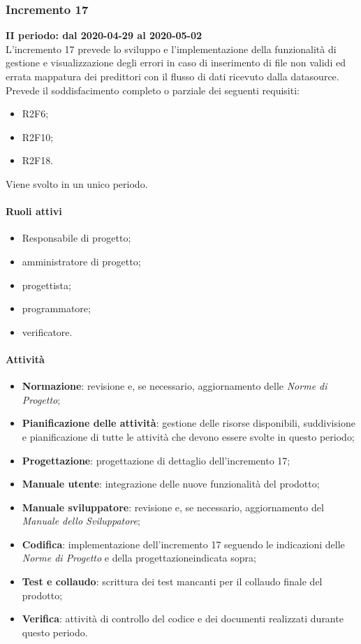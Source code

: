 \subsubsection{Incremento 17}
\textbf{II periodo: dal 2020-04-29 al 2020-05-02} \\
L'incremento 17 prevede lo sviluppo e l'implementazione della funzionalità di gestione e visualizzazione degli errori in caso di inserimento di file non validi ed errata mappatura dei predittori con il flusso di dati ricevuto dalla datasource.
\\Prevede il soddisfacimento completo o parziale dei seguenti requisiti:
\begin{itemize}
	\item R2F6;
	\item R2F10;
	\item R2F18.
\end{itemize}
Viene svolto in un unico periodo.
\paragraph{Ruoli attivi}
\begin{itemize}
	\item Responsabile di progetto\glo;
	\item amministratore di progetto\glo;
	\item progettista;
	\item programmatore;
	\item verificatore.
\end{itemize}
\paragraph{Attività}
\begin{itemize}
	\item \textbf{Normazione}: revisione e, se necessario, aggiornamento delle \textit{Norme di Progetto};
	\item \textbf{Pianificazione delle attività}: gestione delle risorse disponibili, suddivisione e pianificazione di tutte le attività che devono essere svolte in questo periodo;
	\item \textbf{Progettazione}: progettazione di dettaglio dell'incremento 17;
	\item \textbf{Manuale utente}: integrazione delle nuove funzionalità del prodotto\glo;
	\item \textbf{Manuale sviluppatore}:  revisione e, se necessario, aggiornamento del \textit{Manuale dello Sviluppatore};
	\item \textbf{Codifica}: implementazione dell'incremento 17 seguendo le indicazioni delle \textit{Norme di Progetto} e della progettazione\glosp indicata sopra;
	\item \textbf{Test e collaudo}: scrittura dei test mancanti per il collaudo finale del prodotto\glo;
	\item \textbf{Verifica}: attività di controllo del codice e dei documenti realizzati durante questo periodo.
\end{itemize}

